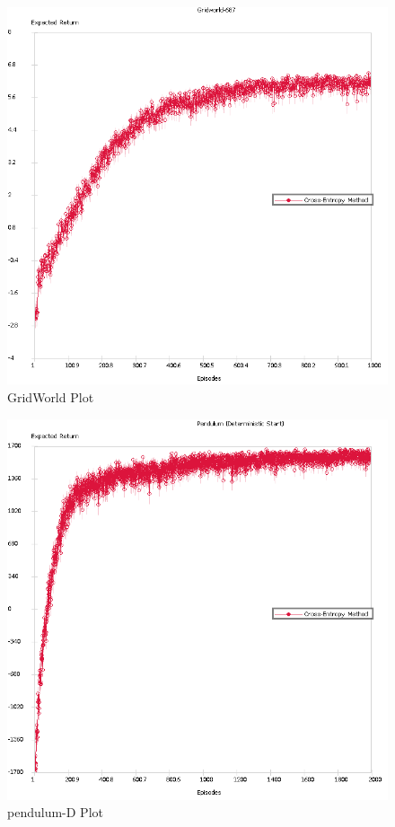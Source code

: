 \documentclass{article}
\begin{document}
\begin{figure}
\includegraphics[scale=0.5]{Gridworld-687_18th_theBest}
\caption{GridWorld Plot}
\label{fig:grid}
\end{figure}


\begin{figure}
\includegraphics[scale=0.5]{Pendulum_Det}
\caption{pendulum-D Plot}
\label{fig:pendulum-D}
\end{figure}
\end{document}
